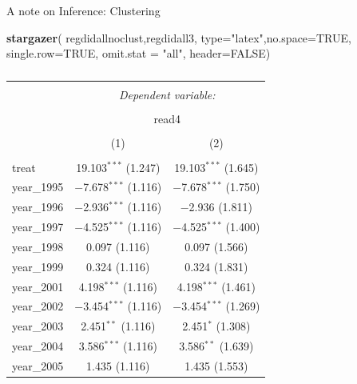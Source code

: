 \documentclass[
  ignorenonframetext,
]{beamer}
\newenvironment{Shaded}{\begin{snugshade}}{\end{snugshade}}
\newcommand{\AttributeTok}[1]{\textcolor[rgb]{0.13,0.29,0.53}{#1}}
\newcommand{\ConstantTok}[1]{\textcolor[rgb]{0.56,0.35,0.01}{#1}}
\newcommand{\FunctionTok}[1]{\textcolor[rgb]{0.13,0.29,0.53}{\textbf{#1}}}
\newcommand{\NormalTok}[1]{#1}
\newcommand{\StringTok}[1]{\textcolor[rgb]{0.31,0.60,0.02}{#1}}
\begin{document}
\begin{frame}[fragile]{A note on Inference: Clustering}
\protect\hypertarget{a-note-on-inference-clustering-2}{}
\tiny

\begin{Shaded}
\begin{Highlighting}[]
\FunctionTok{stargazer}\NormalTok{( regdidallnoclust,regdidall3, }\AttributeTok{type=}\StringTok{"latex"}\NormalTok{,}\AttributeTok{no.space=}\ConstantTok{TRUE}\NormalTok{, }\AttributeTok{single.row=}\ConstantTok{TRUE}\NormalTok{, }\AttributeTok{omit.stat =} \StringTok{"all"}\NormalTok{, }\AttributeTok{header=}\ConstantTok{FALSE}\NormalTok{)}
\end{Highlighting}
\end{Shaded}

\begin{table}[!htbp] \centering 
  \caption{} 
  \label{} 
\begin{tabular}{@{\extracolsep{5pt}}lcc} 
\\[-1.8ex]\hline 
\hline \\[-1.8ex] 
 & \multicolumn{2}{c}{\textit{Dependent variable:}} \\ 
\cline{2-3} 
\\[-1.8ex] & \multicolumn{2}{c}{read4} \\ 
\\[-1.8ex] & (1) & (2)\\ 
\hline \\[-1.8ex] 
 treat & 19.103$^{***}$ (1.247) & 19.103$^{***}$ (1.645) \\ 
  year\_1995 & $-$7.678$^{***}$ (1.116) & $-$7.678$^{***}$ (1.750) \\ 
  year\_1996 & $-$2.936$^{***}$ (1.116) & $-$2.936 (1.811) \\ 
  year\_1997 & $-$4.525$^{***}$ (1.116) & $-$4.525$^{***}$ (1.400) \\ 
  year\_1998 & 0.097 (1.116) & 0.097 (1.566) \\ 
  year\_1999 & 0.324 (1.116) & 0.324 (1.831) \\ 
  year\_2001 & 4.198$^{***}$ (1.116) & 4.198$^{***}$ (1.461) \\ 
  year\_2002 & $-$3.454$^{***}$ (1.116) & $-$3.454$^{***}$ (1.269) \\ 
  year\_2003 & 2.451$^{**}$ (1.116) & 2.451$^{*}$ (1.308) \\ 
  year\_2004 & 3.586$^{***}$ (1.116) & 3.586$^{**}$ (1.639) \\ 
  year\_2005 & 1.435 (1.116) & 1.435 (1.553) \\ 

\end{tabular}
\end{table}
\end{frame}
\end{document}
